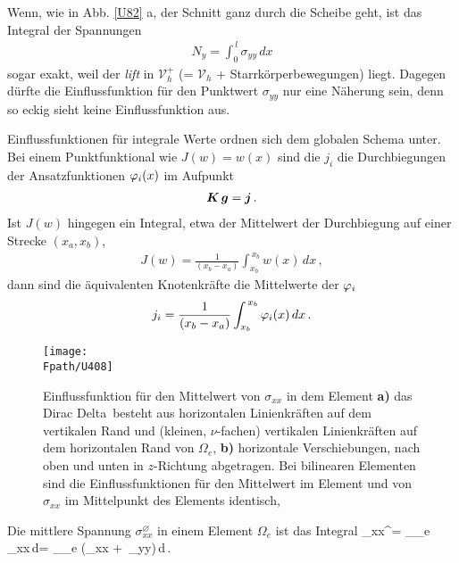 Wenn, wie in Abb. \ref{U82} a, der Schnitt ganz durch die Scheibe geht, ist das Integral der Spannungen
\begin{align}
N_y = \int_0^{\,l} \sigma_{yy}\,dx
\end{align}
sogar exakt, weil der {\em lift\/}  in $\mathcal{V}_h^+$ (= $\mathcal{V}_h$ + Starrk\"{o}rperbewegungen) liegt. Dagegen d\"{u}rfte die Einflussfunktion f\"{u}r den Punktwert $\sigma_{yy}$ nur eine N\"{a}herung sein, denn so eckig sieht keine Einflussfunktion aus.

Einflussfunktionen f\"{u}r integrale Werte ordnen sich dem globalen Schema unter. Bei einem Punktfunktional wie $J(w) = w(x)$ sind die $j_i$ die Durchbiegungen der Ansatzfunktionen $\varphi_i(x)$ im Aufpunkt
\begin{align}
\mbox{\boldmath $K$}\,\mbox{\boldmath $g$} = \mbox{\boldmath $j$}\,.
\end{align}
Ist $J(w)$ hingegen ein Integral, etwa der Mittelwert der Durchbiegung auf einer Strecke $(x_a, x_b)$,
\begin{align}
J(w) = \frac{1}{(x_b - x_a)}\int_{x_b}^{\, x_b} w(x)\,dx\,,
\end{align}
dann sind die \"{a}quivalenten Knotenkr\"{a}fte die Mittelwerte der $\varphi_i$
\begin{align}
j_i = \frac{1}{(x_b - x_a)} \int_{x_b}^{\, x_b}  \varphi_i(x)\,dx\,.
\end{align}
\begin{figure}[tbp]
\centering
\if {} \sidecaption \fi
\texttt{[image: \\Fpath/U408]}
\caption{Einflussfunktion f\"{u}r den Mittelwert von $\sigma_{xx}$ in dem Element {\bf a)\/} das \lqq Dirac Delta\rqq \, besteht aus horizontalen Linienkr\"{a}ften auf dem vertikalen Rand und (kleinen, $\nu$-fachen) vertikalen Linienkr\"{a}ften auf dem horizontalen Rand von $\Omega_e$, {\bf b)\/}
horizontale Verschiebungen, nach oben und unten in $z$-Richtung abgetragen. Bei bilinearen Elementen sind die Einflussfunktionen f\"{u}r den Mittelwert im Element und von $\sigma_{xx}$ im Mittelpunkt des Elements identisch, \cite{Ha5}} \label{U408}
\end{figure}%
Die mittlere Spannung $\sigma_{xx}^\varnothing$ in einem Element $\Omega_e$ ist das Integral
\bfo
\sigma_{xx}^\varnothing = \int_{\Omega_e} \sigma_{xx}\,d\Omega =
\int_{\Omega_e} (\varepsilon_{xx} + \nu\,\varepsilon_{yy})\,d\Omega\,.
